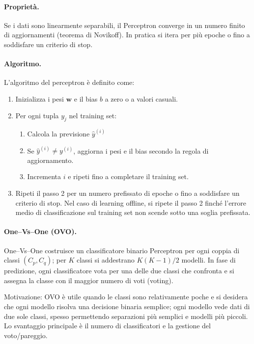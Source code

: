 \paragraph{Proprietà.}
Se i dati sono linearmente separabili, il Perceptron converge in un numero finito di aggiornamenti (teorema di Novikoff). In pratica si itera per più epoche o fino a soddisfare un criterio di stop.

\paragraph{Algoritmo.}
L'algoritmo del perceptron è definito come:
\begin{enumerate}
  \item Inizializza i pesi $\mathbf{w}$ e il bias $b$ a zero o a valori casuali.
  \item Per ogni tupla $y_j$ nel training set:
  \begin{enumerate}
    \item Calcola la previsione $\hat{y}^{(i)}$
    \item Se $\hat{y}^{(i)}\neq y^{(i)}$, aggiorna i pesi e il bias secondo la regola di aggiornamento.
    \item Incrementa $i$ e ripeti fino a completare il training set.
  \end{enumerate}
  \item Ripeti il passo 2 per un numero prefissato di epoche o fino a soddisfare un criterio di stop. Nel caso di learning offline, si ripete il passo 2 finché l'errore medio di classificazione sul training set non scende sotto una soglia prefissata.
\end{enumerate}

\paragraph{One–Vs–One (OVO).}
One–Vs–One costruisce un classificatore binario Perceptron per ogni coppia di classi $(C_p,C_q)$; per $K$ classi si addestrano $K(K-1)/2$ modelli. In fase di predizione, ogni classificatore vota per una delle due classi che confronta e si assegna la classe con il maggior numero di voti (voting).

Motivazione: OVO è utile quando le classi sono relativamente poche e si desidera che ogni modello risolva una decisione binaria semplice; ogni modello vede dati di due sole classi, spesso permettendo separazioni più semplici e modelli più piccoli. Lo svantaggio principale è il numero di classificatori e la gestione del voto/pareggio.


